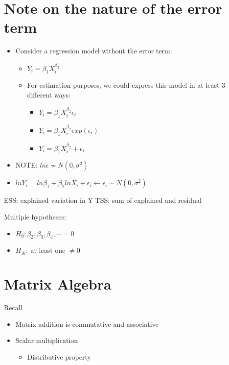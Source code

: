 \documentclass[10pt, oneside]{article}
\begin{document}
\section{Note on the nature of the error term}
\begin{itemize}
    \item Consider a regression model without the error term: 
    \begin{itemize}
        \item $Y_i = \beta_1 X_i ^{\beta_2}$
        \item For estimation purposes, we could express this model in at least 3 different ways:
        \begin{itemize}
            \item $Y_i = \beta_1 X_i ^{\beta_2} \epsilon_i$
            \item $Y_i = \beta_1 X_i ^{\beta_2} exp(\epsilon_i)$
            \item $Y_i =\beta_1 X_i ^{\beta_2}+ \epsilon_i$
        \end{itemize}
    \end{itemize}
    \item NOTE: $ln\epsilon \not \sim N(0, \sigma^2)$
    \item $ln Y_i = ln\beta_1 + \beta_2 lnX_i + \epsilon_i \leftarrow \epsilon_i \sim N(0, \sigma^2)$
\end{itemize}

ESS: explained variation in Y
TSS: sum of explained and residual

Multiple hypotheses:
\begin{itemize}
    \item $H_0: \beta_2, \beta_3, \beta_4, \cdots = 0$
    \item $H_A:$ at least one $\neq 0$
\end{itemize}

\section{Matrix Algebra}
Recall
\begin{itemize}
    \item Matrix addition is commutative and associative
    \item Scalar multiplication
    \begin{itemize}
        \item Distributive property
    \end{itemize}
\end{itemize}
\end{document}
